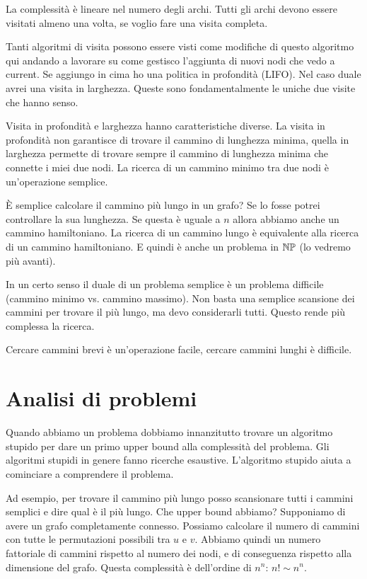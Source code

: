 La complessità è lineare nel numero degli archi. Tutti gli archi devono essere visitati almeno una
volta, se voglio fare una visita completa.

Tanti algoritmi di visita possono essere visti come modifiche di questo algoritmo qui andando a
lavorare su come gestisco l'aggiunta di nuovi nodi che vedo a current. Se aggiungo in cima ho una
politica in profondità (LIFO). Nel caso duale avrei una visita in larghezza. Queste sono
fondamentalmente le uniche due visite che hanno senso.

Visita in profondità e larghezza hanno caratteristiche diverse. La visita in profondità non
garantisce di trovare il cammino di lunghezza minima, quella in larghezza permette di trovare sempre
il cammino di lunghezza minima che connette i miei due nodi. La ricerca di un cammino minimo tra due
nodi è un'operazione semplice.

È semplice calcolare il cammino più lungo in un grafo? Se lo fosse potrei controllare la sua
lunghezza. Se questa è uguale a $n$ allora abbiamo anche un cammino hamiltoniano. La ricerca di un
cammino lungo è equivalente alla ricerca di un cammino hamiltoniano. E quindi è anche un problema
in $\mathbb{NP}$ (lo vedremo più avanti).

In un certo senso il duale di un problema semplice è un problema difficile (cammino minimo vs.
cammino massimo). Non basta una semplice scansione dei cammini per trovare il più lungo, ma devo
considerarli tutti. Questo rende più complessa la ricerca.

Cercare cammini brevi è un'operazione facile, cercare cammini lunghi è difficile.

\section{Analisi di problemi}

Quando abbiamo un problema dobbiamo innanzitutto trovare un algoritmo stupido per dare un primo
upper bound alla complessità del problema. Gli algoritmi stupidi in genere fanno ricerche
esaustive. L'algoritmo stupido aiuta a cominciare a comprendere il problema.

Ad esempio, per trovare il cammino più lungo posso scansionare tutti i cammini semplici e dire qual
è il più lungo. Che upper bound abbiamo? Supponiamo di avere un grafo completamente connesso.
Possiamo calcolare il numero di cammini con tutte le permutazioni possibili tra $u$ e $v$. Abbiamo
quindi un numero fattoriale di cammini rispetto al numero dei nodi, e di conseguenza rispetto alla
dimensione del grafo. Questa complessità è dell'ordine di $n^{n}$: $n! \sim n^{n}$. 


